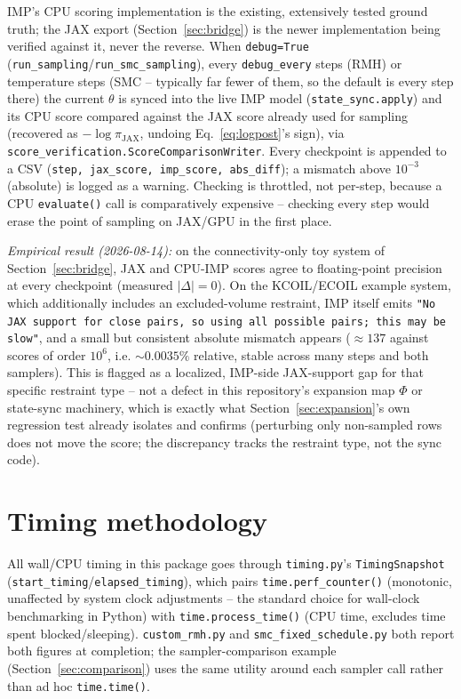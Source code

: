 \documentclass[11pt]{article}
\begin{document}
IMP's CPU scoring implementation is the existing, extensively tested
ground truth; the JAX export (Section~\ref{sec:bridge}) is the newer
implementation being verified against it, never the reverse. When
\texttt{debug=True} (\texttt{run\_sampling}/\texttt{run\_smc\_sampling}),
every \texttt{debug\_every} steps (RMH) or temperature steps (SMC --
typically far fewer of them, so the default is every step there) the
current $\theta$ is synced into the live IMP model
(\texttt{state\_sync.apply}) and its CPU score compared against the JAX
score already used for sampling (recovered as $-\log\pi_{\text{JAX}}$,
undoing Eq.~\eqref{eq:logpost}'s sign), via
\texttt{score\_verification.ScoreComparisonWriter}. Every checkpoint is
appended to a CSV (\texttt{step, jax\_score, imp\_score, abs\_diff}); a
mismatch above $10^{-3}$ (absolute) is logged as a warning. Checking is
throttled, not per-step, because a CPU \texttt{evaluate()} call is
comparatively expensive -- checking every step would erase the point of
sampling on JAX/GPU in the first place.

\emph{Empirical result (2026-08-14):} on the connectivity-only toy system
of Section~\ref{sec:bridge}, JAX and CPU-IMP scores agree to floating-point
precision at every checkpoint (measured $|\Delta| = 0$). On the KCOIL/ECOIL
example system, which additionally includes an excluded-volume restraint,
IMP itself emits \texttt{"No JAX support for close pairs, so using all
possible pairs; this may be slow"}, and a small but consistent absolute
mismatch appears ($\approx 137$ against scores of order $10^6$, i.e.
$\sim 0.0035\%$ relative, stable across many steps and both samplers). This
is flagged as a localized, IMP-side JAX-support gap for that specific
restraint type -- not a defect in this repository's expansion map $\Phi$ or
state-sync machinery, which is exactly what Section~\ref{sec:expansion}'s
own regression test already isolates and confirms (perturbing only
non-sampled rows does not move the score; the discrepancy tracks the
restraint type, not the sync code).

\section{Timing methodology}
\label{sec:timing}

All wall/CPU timing in this package goes through \texttt{timing.py}'s
\texttt{TimingSnapshot} (\texttt{start\_timing}/\texttt{elapsed\_timing}),
which pairs \texttt{time.perf\_counter()} (monotonic, unaffected by system
clock adjustments -- the standard choice for wall-clock benchmarking in
Python) with \texttt{time.process\_time()} (CPU time, excludes time spent
blocked/sleeping). \texttt{custom\_rmh.py} and \texttt{smc\_fixed\_schedule.py}
both report both figures at completion; the sampler-comparison example
(Section~\ref{sec:comparison}) uses the same utility around each sampler
call rather than ad hoc \texttt{time.time()}.
\end{document}
